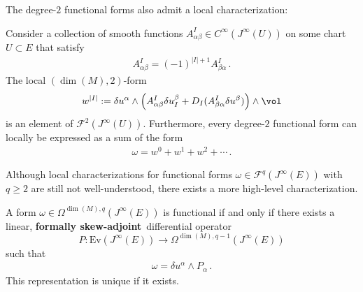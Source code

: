     The degree-$2$ functional forms also admit a local characterization:
    \begin{property}
        Consider a collection of smooth functions $A^I_{\alpha\beta}\in C^\infty(J^\infty(U))$ on some chart $U\subset E$ that satisfy
        \begin{gather}
            A^I_{\alpha\beta} = (-1)^{|I|+1}A^I_{\beta\alpha}\,.
        \end{gather}
        The local $(\dim(M),2)$-form
        \begin{gather}
            w^{|I|} := \delta u^\alpha\wedge\left(A^I_{\alpha\beta}\delta u^\beta_I + D_I(A^I_{\beta\alpha}\delta u^\beta)\right)\wedge\vol
        \end{gather}
        is an element of $\mathcal{F}^2(J^\infty(U))$. Furthermore, every degree-$2$ functional form can locally be expressed as a sum of the form
        \begin{gather}
            \omega = w^0 + w^1 + w^2 + \cdots\,.
        \end{gather}
    \end{property}

    Although local characterizations for functional forms $\omega\in\mathcal{F}^q(J^\infty(E))$ with $q\geq2$ are still not well-understood, there exists a more high-level characterization.
    \begin{property}
        A form $\omega\in\Omega^{\dim(M),q}(J^\infty(E))$ is functional if and only if there exists a linear, \textbf{formally skew-adjoint}\footnotemark\ differential operator \[P:\mathrm{Ev}(J^\infty(E))\rightarrow\Omega^{\dim(M),q-1}(J^\infty(E))\] such that
        \begin{gather}
            \omega = \delta u^\alpha\wedge P_\alpha\,.
        \end{gather}
        This representation is unique if it exists.
    \end{property}

